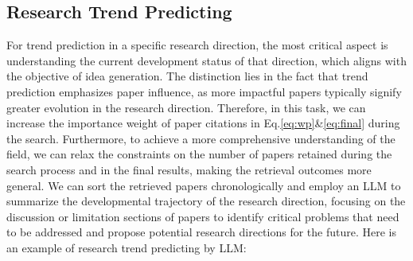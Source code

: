 \documentclass{llmxive}
\begin{document}
\subsection{Research Trend Predicting}
For trend prediction in a specific research direction, the most critical aspect is understanding the current development status of that direction, which aligns with the objective of idea generation.
The distinction lies in the fact that trend prediction emphasizes paper influence, as more impactful papers typically signify greater evolution in the research direction.
Therefore, in this task, we can increase the importance weight of paper citations in Eq.\ref{eq:wp}\&\ref{eq:final} during the search.
Furthermore, to achieve a more comprehensive understanding of the field, we can relax the constraints on the number of papers retained during the search process and in the final results, making the retrieval outcomes more general.
We can sort the retrieved papers chronologically and employ an LLM to summarize the developmental trajectory of the research direction, focusing on the discussion or limitation sections of papers to identify critical problems that need to be addressed and propose potential research directions for the future.
Here is an example of research trend predicting by LLM:
\end{document}
